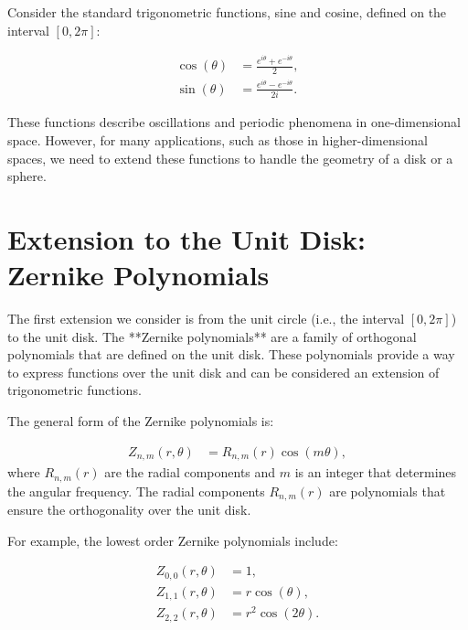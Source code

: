 Consider the standard trigonometric functions, sine and cosine, defined on the interval \([0, 2\pi]\):

\begin{equation}
\begin{split}
\cos(\theta) &= \frac{e^{i\theta} + e^{-i\theta}}{2}, \\
\sin(\theta) &= \frac{e^{i\theta} - e^{-i\theta}}{2i}.
\end{split}
\end{equation}

These functions describe oscillations and periodic phenomena in one-dimensional space. However, for many applications, such as those in higher-dimensional spaces, we need to extend these functions to handle the geometry of a disk or a sphere.

\section{Extension to the Unit Disk: Zernike Polynomials}

The first extension we consider is from the unit circle (i.e., the interval \([0, 2\pi]\)) to the unit disk. The **Zernike polynomials** are a family of orthogonal polynomials that are defined on the unit disk. These polynomials provide a way to express functions over the unit disk and can be considered an extension of trigonometric functions.

The general form of the Zernike polynomials is:

\begin{equation}
\begin{split}
Z_{n,m}(r, \theta) &= R_{n,m}(r) \cos(m\theta),
\end{split}
\end{equation}
where \(R_{n,m}(r)\) are the radial components and \(m\) is an integer that determines the angular frequency. The radial components \(R_{n,m}(r)\) are polynomials that ensure the orthogonality over the unit disk.

For example, the lowest order Zernike polynomials include:

\begin{equation}
\begin{split}
Z_{0,0}(r, \theta) &= 1, \\
Z_{1,1}(r, \theta) &= r \cos(\theta), \\
Z_{2,2}(r, \theta) &= r^2 \cos(2\theta).
\end{split}
\end{equation}


